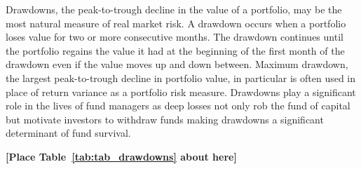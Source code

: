 Drawdowns, the peak-to-trough decline in the value of a portfolio, may be the most natural measure of real market risk. \citep{magdon-ismail_maximum_2006} A drawdown occurs when a portfolio loses value for two or more consecutive months. The drawdown continues until the portfolio regains the value it had at the beginning of the first month of the drawdown even if the value moves up and down between. Maximum drawdown, the largest peak-to-trough decline in portfolio value, in particular is often used in place of return variance as a portfolio risk measure. \citep{johansen_large_2000,articlev1,noauthor_sornette_nodate} Drawdowns play a significant role in the lives of fund managers as deep losses not only rob the fund of capital but motivate investors to withdraw funds making drawdowns a significant determinant of fund survival. \citep{baba_hedge_nodate,papaioannou_procyclical_2013,lang_2006} %

\bigskip
\centerline{\bf [Place Table~\ref{tab:tab_drawdowns} about here]}
\bigskip

